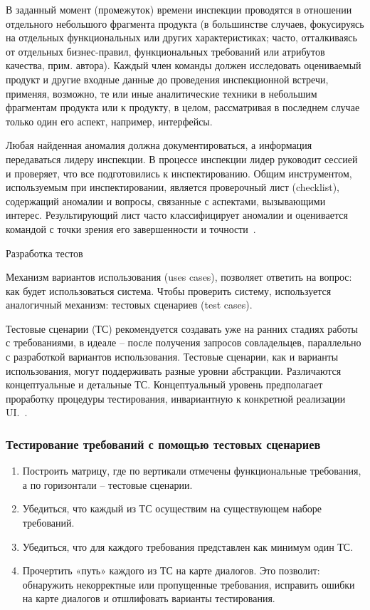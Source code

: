 \documentclass{../industrial-development}
\begin{document}
{В заданный момент (промежуток) времени инспекции проводятся в отношении отдельного небольшого
фрагмента продукта (в большинстве случаев, фокусируясь на отдельных функциональных
или других характеристиках; часто, отталкиваясь от отдельных бизнес-правил,
функциональных требований или атрибутов качества, прим. автора). Каждый член
команды должен исследовать оцениваемый продукт и другие входные данные до
проведения инспекционной встречи, применяя, возможно, те или иные аналитические
техники в небольшим фрагментам продукта или к продукту, в целом, рассматривая в
последнем случае только один его аспект, например, интерфейсы.

Любая найденная
аномалия должна документироваться, а информация передаваться лидеру инспекции. В
процессе инспекции лидер руководит сессией и проверяет, что все подготовились к
инспектированию. Общим инструментом, используемым при инспектировании, является
проверочный лист (checklist), содержащий аномалии и вопросы, связанные с аспектами,
вызывающими интерес. Результирующий лист часто классифицирует аномалии и
оценивается командой с точки зрения его завершенности и точности~\cite[с.~67]{Maglinec}.

\alert{Разработка тестов}

Механизм вариантов использования (uses cases), 
позволяет ответить на вопрос: как будет использоваться система. Чтобы проверить
систему, используется аналогичный механизм: тестовых сценариев (test cases).

Тестовые сценарии (ТС) рекомендуется создавать уже на ранних стадиях работы с
требованиями, в идеале – после получения запросов совладельцев, параллельно с
разработкой вариантов использования. Тестовые сценарии, как и варианты использования, могут поддерживать разные
уровни абстракции. Различаются концептуальные и детальные ТС. Концептуальный
уровень предполагает проработку процедуры тестирования, инвариантную к конкретной
реализации UI.~\cite[с.~67--68]{Maglinec}.

\begin{frame} \frametitle {Тестирование требований с
помощью тестовых сценариев}
\begin{enumerate}
\item Построить матрицу, где по вертикали отмечены
функциональные требования, а по горизонтали –
тестовые сценарии.
\item Убедиться, что каждый из ТС осуществим на
существующем наборе требований.
\item Убедиться, что для каждого требования
представлен как минимум один ТС.
\item Прочертить «путь» каждого из ТС на карте
диалогов. Это позволит: обнаружить некорректные
или пропущенные требования, исправить ошибки на
карте диалогов и отшлифовать варианты
тестирования.
\end{enumerate}
\end{frame}

}
\end{document}
